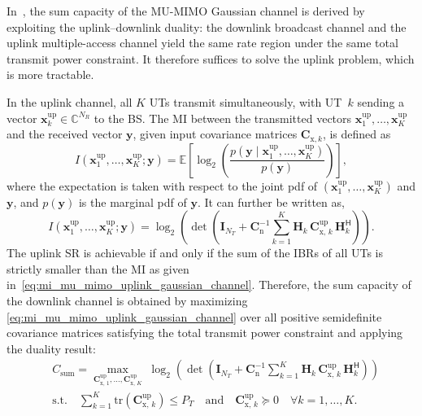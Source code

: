 In~\cite{viswanath_2002, viswanath_2003, yu_2004}, the sum capacity of the \ac{MU}-\ac{MIMO} Gaussian channel is derived by exploiting the uplink--downlink duality: the downlink broadcast channel and the uplink multiple-access channel yield
the same rate region under the same total transmit power constraint. It therefore suffices to solve the uplink problem, which is more tractable.

In the uplink channel, all $K$ \acp{UT} transmit simultaneously, with \ac{UT}~$k$ sending a vector $\mathbf{x}_k^{\text{up}} \in \mathbb{C}^{N_R}$ to the \ac{BS}.
The \ac{MI} between the transmitted vectors $\mathbf{x}_1^{\text{up}}, \dots, \mathbf{x}_K^{\text{up}}$ and the received vector $\mathbf{y}$, given input covariance matrices $\mathbf{C}_{\mathrm{x},k}$, is defined as
\begin{equation}
\label{eq:mutual_information_mu_mimo_uplink}
    I(\mathbf{x}_1^{\text{up}}, \dots, \mathbf{x}_K^{\text{up}}; \mathbf{y})
    = \mathbb{E}\!\left[ \log_2\!\left( \frac{p(\mathbf{y} \mid \mathbf{x}_1^{\text{up}}, \dots, \mathbf{x}_K^{\text{up}})}{p(\mathbf{y})} \right) \right],
\end{equation}
where the expectation is taken with respect to the joint \ac{pdf} of $(\mathbf{x}_1^{\text{up}}, \dots, \mathbf{x}_K^{\text{up}})$ and $\mathbf{y}$, and $p(\mathbf{y})$ is the marginal \ac{pdf} of $\mathbf{y}$.
It can further be written as,
\begin{equation}
\label{eq:mi_mu_mimo_uplink_gaussian_channel}
    I(\mathbf{x}_1^{\text{up}}, \dots, \mathbf{x}_K^{\text{up}}; \mathbf{y})
    = \log_2\!\left(\det\!\left(\mathbf{I}_{N_T} + \mathbf{C}_{\mathrm{n}}^{-1} \sum_{k=1}^{K} \mathbf{H}_k\,\mathbf{C}_{\mathrm{x},\, k}^{\text{up}}\,\mathbf{H}_k^\mathsf{H} \right)\right).
\end{equation}
The uplink \ac{SR} is achievable if and only if the sum of the \ac{IBR}s of all \acp{UT} is strictly smaller than the \ac{MI} as given in~\eqref{eq:mi_mu_mimo_uplink_gaussian_channel}. Therefore, the sum capacity of the downlink channel is obtained by maximizing \eqref{eq:mi_mu_mimo_uplink_gaussian_channel} over all positive semidefinite covariance matrices satisfying the total transmit power constraint and applying the duality result:
\begin{equation}
\label{eq:sum_capacity_mu_mimo_gaussian_channel}
\begin{aligned}
    & C_{\text{sum}} = \max_{\mathbf{C}_{\mathrm{x},\,1}^{\text{up}}, \dots, \mathbf{C}_{\mathrm{x},\,K}^{\text{up}}} \; \log_2\!\left(\det\!\left(\mathbf{I}_{N_T} + \mathbf{C}_{\mathrm{n}}^{-1} \sum_{k=1}^{K} \mathbf{H}_k\,\mathbf{C}_{\mathrm{x},\, k}^{\text{up}}\,\mathbf{H}_k^\mathsf{H} \right)\right) \\
    &\text{s.t.} \quad \sum_{k=1}^{K} \mathrm{tr}\!\left(\mathbf{C}_{\mathrm{x},\, k}^{\text{up}}\right) \leq P_T \quad \text{and} \quad \mathbf{C}_{\mathrm{x},\, k}^{\text{up}} \succeq 0 \quad \forall k = 1, \dots, K.
\end{aligned}
\end{equation}
